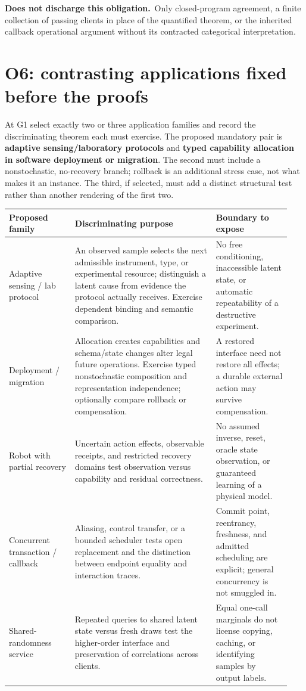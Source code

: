 \documentclass[11pt,a4paper]{article}
\newcommand{\notaccepted}{\par\textbf{Does not discharge this obligation.}\ }
\begin{document}
\notaccepted Only closed-program agreement, a finite collection of passing
clients in place of the quantified theorem, or the inherited callback
operational argument without its contracted categorical interpretation.

\section{O6: contrasting applications fixed before the proofs}\label{sec:o6}

At G1 select exactly two or three application families and record the
discriminating theorem each must exercise. The proposed mandatory pair is
\textbf{adaptive sensing/laboratory protocols} and \textbf{typed capability
allocation in software deployment or migration}. The second must include a
nonstochastic, no-recovery branch; rollback is an additional stress case,
not what makes it an instance. The third, if selected, must add a distinct
structural test rather than another rendering of the first two.

\begin{longtable}{@{}p{0.22\linewidth}p{0.47\linewidth}p{0.25\linewidth}@{}}
\toprule
Proposed family & Discriminating purpose & Boundary to expose \\
\midrule
\endhead
Adaptive sensing / lab protocol &
An observed sample selects the next admissible instrument, type, or
experimental resource; distinguish a latent cause from evidence the protocol
actually receives. Exercise dependent binding and semantic comparison. &
No free conditioning, inaccessible latent state, or automatic repeatability
of a destructive experiment. \\
Deployment / migration &
Allocation creates capabilities and schema/state changes alter legal future
operations. Exercise typed nonstochastic composition and representation
independence; optionally compare rollback or compensation. &
A restored interface need not restore all effects; a durable external action
may survive compensation. \\
Robot with partial recovery &
Uncertain action effects, observable receipts, and restricted recovery
domains test observation versus capability and residual correctness. &
No assumed inverse, reset, oracle state observation, or guaranteed learning
of a physical model. \\
Concurrent transaction / callback &
Aliasing, control transfer, or a bounded scheduler tests open replacement
and the distinction between endpoint equality and interaction traces. &
Commit point, reentrancy, freshness, and admitted scheduling are explicit;
general concurrency is not smuggled in. \\
Shared-randomness service &
Repeated queries to shared latent state versus fresh draws test the
higher-order interface and preservation of correlations across clients. &
Equal one-call marginals do not license copying, caching, or identifying
samples by output labels. \\
\bottomrule
\end{longtable}
\end{document}
